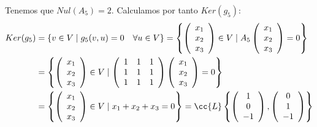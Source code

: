 \begin{ejercicio}
\begin{enumerate}
\begin{enumerate}
            Tenemos que $Nul(A_5)=2$. Calculamos por tanto $Ker(g_5)$:
            \begin{equation*}\begin{split}
                Ker(g_5) &= \{v \in V \mid g_5(v,u) = 0 \quad \forall u\in V\} 
                = \left\{ \left(\begin{array}{c}
                     x_1 \\ x_2 \\ x_3
                \end{array} \right) \in V \mid A_5
                \left(\begin{array}{c}
                     x_1 \\ x_2 \\ x_3
                \end{array} \right) = 0\right\} \\
                &= \left\{ \left(\begin{array}{c}
                     x_1 \\ x_2 \\ x_3
                \end{array} \right) \in V \mid
                \left(\begin{array}{ccc}
                    1 & 1 & 1 \\
                    1 & 1 & 1 \\
                    1 & 1 & 1 \\
                \end{array} \right) 
                \left(\begin{array}{c}
                     x_1 \\ x_2 \\ x_3
                \end{array} \right) = 0\right\} \\
                &= \left\{ \left(\begin{array}{c}
                     x_1 \\ x_2 \\ x_3
                \end{array} \right) \in V \mid x_1+x_2+x_3 = 0\right\}
                = \cc{L} \left\{ \left(\begin{array}{c}
                     1 \\  0 \\ -1
                \end{array} \right),
                \left(\begin{array}{c}
                     0 \\ 1 \\ -1
                \end{array} \right)\right\}
            \end{split}\end{equation*}


\end{enumerate}
\end{enumerate}
\end{ejercicio}

